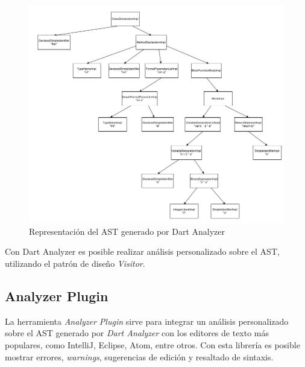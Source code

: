 	\begin{figure}[ht]
		\centering
		\includegraphics[scale=0.58]{imagenes/ast.png}
		\caption{Representación del AST generado por Dart Analyzer}
		\label{}
	\end{figure}

	Con Dart Analyzer es posible realizar análisis personalizado sobre el AST, utilizando el patrón de diseño \textit{Visitor}.

	\subsection{Analyzer Plugin}

	La herramienta \textit{Analyzer Plugin} sirve para integrar un análisis personalizado sobre el AST generado por \textit{Dart Analyzer} con los editores de texto más populares, como IntelliJ, Eclipse, Atom, entre otros. Con esta librería es posible mostrar errores, \textit{warnings}, sugerencias de edición y resaltado de sintaxis. %

